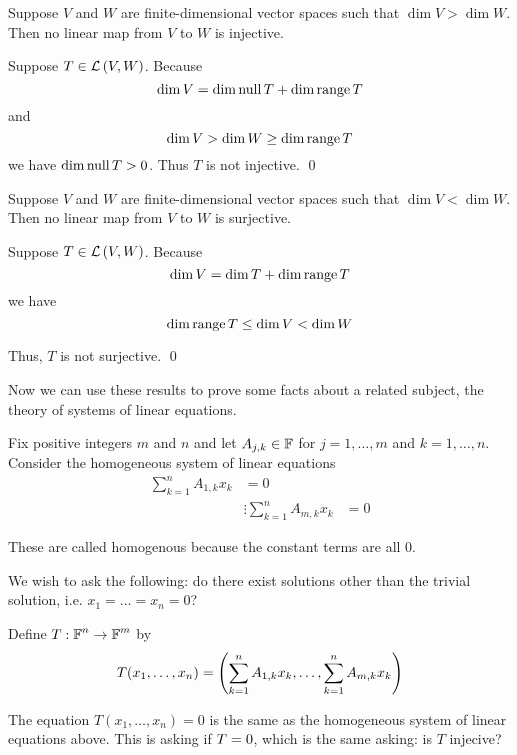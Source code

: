 \begin{theorem} 
   Suppose $V$ and $W$ are finite-dimensional vector spaces such that
   $\dim V > \dim W$. Then no linear map from $V$ to $W$ is injective.
   \begin{proof*}
      Suppose $T \in \mathcal{L} \left( V, W \right)$. Because
      \[ \dim V = \dim \operatorname{null} T + \dim \operatorname{range} T \]
      and
      \[ \dim V > \dim W \geq \dim \operatorname{range} T \]
      we have $\dim \operatorname{null} T > 0$. Thus $T$ is not injective. \qed
   \end{proof*}
\end{theorem}

\begin{theorem} 
   Suppose $V$ and $W$ are finite-dimensional vector spaces such that
   $\dim V < \dim W$. Then no linear map from $V$ to $W$ is surjective.

   \begin{proof*}
      Suppose $T \in \mathcal{L} \left( V, W \right)$. Because
      \[ \dim V = \dim \null T + \dim \range T \]
      we have
      \[ \dim \operatorname{range} T \leq \dim V < \dim W \]

      Thus, $T$ is not surjective. \qed
   \end{proof*}
\end{theorem}

Now we can use these results to prove some facts about a related
subject, the theory of systems of linear equations.

\begin{definition} 
   Fix positive integers $m$ and $n$ and let $A_{j, k} \in \operatorname{\mathbb{F}}$ for
   $j = 1, \dots, m$ and $k = 1, \dots, n$. Consider
   the homogeneous system of linear equations
   \begin{align*}
      \sum_{k=1}^n A_{1,k}x_k &= 0 \\
      &\vdots
      \sum_{k=1}^n A_{m,k}x_k &= 0
   \end{align*}

   These are called homogenous because the constant terms are
   all 0.
\end{definition}

We wish to ask the following: do there exist solutions other than the
trivial solution, i.e. $x_1 = \dots = x_n = 0$?

Define $T: \operatorname{\mathbb{F}}^n \to \operatorname{\mathbb{F}}^m$ by
\[ T(x_1, \dots, x_n) = \qty(\sum_{k=1}^n A_{1,k}x_k, \dots, \sum_{k=1}^n A_{m,k}x_k) \]

The equation $T(x_1, \dots, x_n) = 0$ is the same as the homogeneous
system of linear equations above. This is asking if $\null T = 0$,
which is the same asking: is $T$ injecive?

